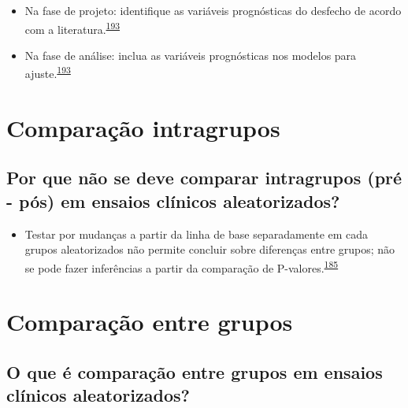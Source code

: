 \documentclass[
  a4paper,
]{book}
\providecommand{\tightlist}{%
  \setlength{\itemsep}{0pt}\setlength{\parskip}{0pt}}
\begin{document}
\begin{itemize}
\item
  Na fase de projeto: identifique as variáveis prognósticas do desfecho de acordo com a literatura.\textsuperscript{\protect\hyperlink{ref-roberts1999}{193}}
\item
  Na fase de análise: inclua as variáveis prognósticas nos modelos para ajuste.\textsuperscript{\protect\hyperlink{ref-roberts1999}{193}}
\end{itemize}

\hypertarget{comparacao-intragrupos}{%
\section{Comparação intragrupos}\label{comparacao-intragrupos}}

\hypertarget{por-que-nuxe3o-se-deve-comparar-intragrupos-pruxe9---puxf3s-em-ensaios-cluxednicos-aleatorizados}{%
\subsection{Por que não se deve comparar intragrupos (pré - pós) em ensaios clínicos aleatorizados?}\label{por-que-nuxe3o-se-deve-comparar-intragrupos-pruxe9---puxf3s-em-ensaios-cluxednicos-aleatorizados}}

\begin{itemize}
\tightlist
\item
  Testar por mudanças a partir da linha de base separadamente em cada grupos aleatorizados não permite concluir sobre diferenças entre grupos; não se pode fazer inferências a partir da comparação de P-valores.\textsuperscript{\protect\hyperlink{ref-bland2011}{185}}
\end{itemize}

\hypertarget{comparacao-entre-grupos}{%
\section{Comparação entre grupos}\label{comparacao-entre-grupos}}

\hypertarget{o-que-uxe9-comparauxe7uxe3o-entre-grupos-em-ensaios-cluxednicos-aleatorizados}{%
\subsection{O que é comparação entre grupos em ensaios clínicos aleatorizados?}\label{o-que-uxe9-comparauxe7uxe3o-entre-grupos-em-ensaios-cluxednicos-aleatorizados}}
\end{document}
